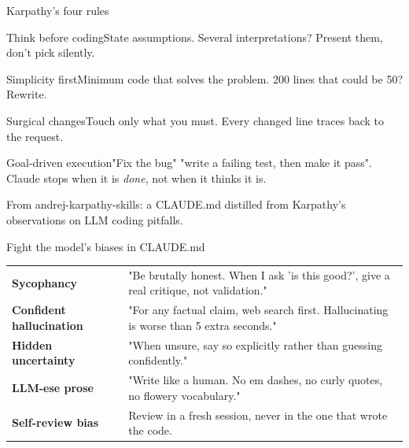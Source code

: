 \documentclass[aspectratio=169,11pt,t]{beamer}
\begin{document}
\begin{frame}{Karpathy's four rules}
  \begin{tcbraster}[raster columns=2, raster equal height, raster column skip=7pt, raster row skip=7pt]
    \begin{card}{Think before coding}State assumptions. Several interpretations? Present them, don't pick silently.\end{card}
    \begin{card}{Simplicity first}Minimum code that solves the problem. 200 lines that could be 50? Rewrite.\end{card}
    \begin{card}{Surgical changes}Touch only what you must. Every changed line traces back to the request.\end{card}
    \begin{card}{Goal-driven execution}"Fix the bug" \ra{} "write a failing test, then make it pass". Claude stops when it is \emph{done}, not when it thinks it is.\end{card}
  \end{tcbraster}\par\vspace{0.3em}
  {\footnotesize\color{muted}From andrej-karpathy-skills: a CLAUDE.md distilled from Karpathy's observations on LLM coding pitfalls.}
\end{frame}

\begin{frame}{Fight the model's biases in CLAUDE.md}
  \footnotesize
  \begin{tabularx}{\textwidth}{@{}L{3.4cm}Y@{}}
    \toprule
     & \\
    \midrule
    \textbf{Sycophancy} & "Be brutally honest. When I ask 'is this good?', give a real critique, not validation."\\
    \textbf{Confident hallucination} & "For any factual claim, web search first. Hallucinating is worse than 5 extra seconds."\\
    \textbf{Hidden uncertainty} & "When unsure, say so explicitly rather than guessing confidently."\\
    \textbf{LLM-ese prose} & "Write like a human. No em dashes, no curly quotes, no flowery vocabulary."\\
    \textbf{Self-review bias} & Review in a fresh session, never in the one that wrote the code.\\
    \bottomrule
  \end{tabularx}
\end{frame}
\end{document}
